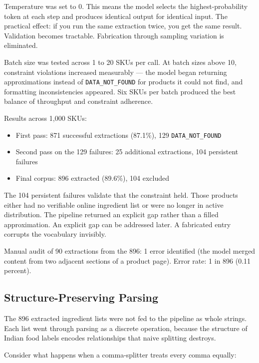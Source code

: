 \documentclass[
  letterpaper,
  DIV=11,
  numbers=noendperiod]{scrartcl}
\providecommand{\tightlist}{%
  \setlength{\itemsep}{0pt}\setlength{\parskip}{0pt}}
\begin{document}
Temperature was set to 0. This means the model selects the
highest-probability token at each step and produces identical output for
identical input. The practical effect: if you run the same extraction
twice, you get the same result. Validation becomes tractable.
Fabrication through sampling variation is eliminated.

Batch size was tested across 1 to 20 SKUs per call. At batch sizes above
10, constraint violations increased measurably --- the model began
returning approximations instead of \texttt{DATA\_NOT\_FOUND} for
products it could not find, and formatting inconsistencies appeared. Six
SKUs per batch produced the best balance of throughput and constraint
adherence.

Results across 1,000 SKUs:

\begin{itemize}
\tightlist
\item
  First pass: 871 successful extractions (87.1\%), 129
  \texttt{DATA\_NOT\_FOUND}
\item
  Second pass on the 129 failures: 25 additional extractions, 104
  persistent failures
\item
  Final corpus: 896 extracted (89.6\%), 104 excluded
\end{itemize}

The 104 persistent failures validate that the constraint held. Those
products either had no verifiable online ingredient list or were no
longer in active distribution. The pipeline returned an explicit gap
rather than a filled approximation. An explicit gap can be addressed
later. A fabricated entry corrupts the vocabulary invisibly.

Manual audit of 90 extractions from the 896: 1 error identified (the
model merged content from two adjacent sections of a product page).
Error rate: 1 in 896 (0.11 percent).

\subsection{Structure-Preserving
Parsing}\label{structure-preserving-parsing}

The 896 extracted ingredient lists were not fed to the pipeline as whole
strings. Each list went through parsing as a discrete operation, because
the structure of Indian food labels encodes relationships that naive
splitting destroys.

Consider what happens when a comma-splitter treats every comma equally:
\end{document}
